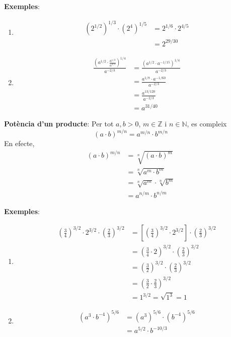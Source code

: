 \textbf{Exemples}:

\begin{enumerate}
\item 
\begin{align*}
\left( 2^{1/2}\right) ^{1/3}\cdot \left( 2^{4}\right) ^{1/5} &=2^{1/6}\cdot
2^{4/5} \\
&=2^{29/30}
\end{align*}

\item 
\begin{align*}
\frac{\left( a^{1/2}\cdot \frac{a^{1/3}}{a^{2/5}}\right) ^{1/4}}{a^{-2/3}}
&=\frac{\left( a^{1/2}\cdot a^{-1/15}\right) ^{1/4}}{a^{-2/3}} \\
&=\frac{a^{1/8}\cdot a^{-1/60}}{a^{-2/3}} \\
&=\frac{a^{13/120}}{a^{-2/3}} \\
&=a^{31/40}
\end{align*}
\end{enumerate}

\textbf{Potència d’un producte}: Per tot $a,b>0$, $m\in \mathbb{Z}$ i $%
n\in \mathbb{N}$, es compleix%
\begin{equation*}
(a\cdot b)^{m/n}=a^{m/n}\cdot b^{m/n}
\end{equation*}%
En efecte,%
\begin{align*}
(a\cdot b)^{m/n} &=\sqrt[n]{(a\cdot b)^{m}} \\
&=\sqrt[n]{a^{m}\cdot b^{m}} \\
&=\sqrt[n]{a^{m}}\cdot \sqrt[n]{b^{m}} \\
&=a^{n/m}\cdot b^{n/m}
\end{align*}

\textbf{Exemples}:

\begin{enumerate}
\item 
\begin{align*}
\left( \frac{3}{4}\right) ^{3/2}\cdot 2^{3/2}\cdot \left( \frac{2}{3}\right)
^{3/2} &=\left[ \left( \frac{3}{4}\right) ^{3/2}\cdot 2^{3/2}\right] \cdot
\left( \frac{2}{3}\right) ^{3/2} \\
&=\left( \frac{3}{4}\cdot 2\right) ^{3/2}\cdot \left( \frac{2}{3}\right)
^{3/2} \\
&=\left( \frac{3}{2}\right) ^{3/2}\cdot \left( \frac{2}{3}\right) ^{3/2} \\
&=\left( \frac{3}{2}\cdot \frac{2}{3}\right) ^{3/2} \\
&=1^{3/2}=\sqrt{1^{3}}=1
\end{align*}

\item 
\begin{align*}
\left( a^{3}\cdot b^{-4}\right) ^{5/6} &=\left( a^{3}\right) ^{5/6}\cdot
\left( b^{-4}\right) ^{5/6} \\
&=a^{5/2}\cdot b^{-10/3}
\end{align*}
\end{enumerate}


